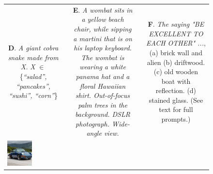 \begin{figure}[ht!]
\begin{adjustwidth}{-0.8in}{-0.5in}
\begin{tabular}{cccccccccccccccccccc}
\multicolumn{6}{p{\thirdcolwidth\textwidth}}{{\tiny \textbf{D}. \textit{A giant cobra snake made from X.} \textit{X} $\in$ \{\textit{``salad'', ``pancakes'', ``sushi'', ``corn''}\}}} &&
\multicolumn{6}{p{\thirdcolwidth\textwidth}}{{\tiny \textbf{E}. \textit{A wombat sits in a yellow beach chair, while sipping a martini that is on his laptop keyboard. The wombat is wearing a white panama hat and a floral Hawaiian shirt. Out-of-focus palm trees in the background. DSLR photograph. Wide-angle view.}}} &&
\multicolumn{6}{p{\thirdcolwidth\textwidth}}{{\tiny \textbf{F}. \textit{The saying "BE EXCELLENT TO EACH OTHER" ...}, (a) brick wall and alien (b) driftwood. (c) old wooden boat with reflection. (d) stained glass. (See text for full prompts.)}} \\

\multicolumn{2}{c}{\includegraphics[width=\threebythreecolwidth\textwidth]{figures/cherries/porsche1977.jpg}} &

\end{tabular}
\end{adjustwidth}
\end{figure}
